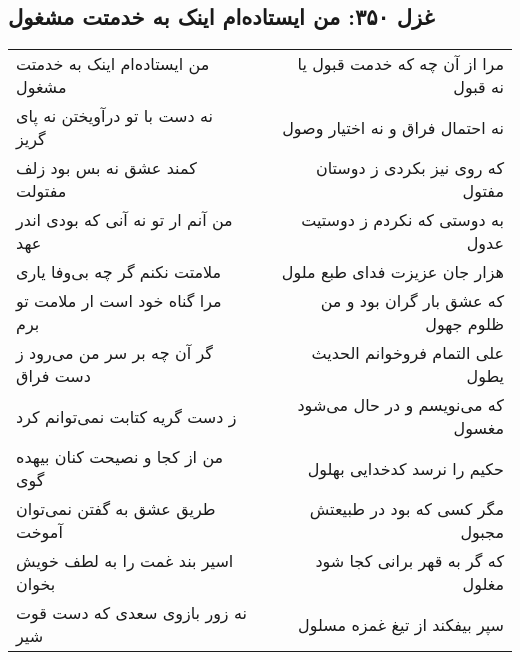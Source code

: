 \begin{center}
\section*{غزل ۳۵۰: من ایستاده‌ام اینک به خدمتت مشغول}
\label{sec:350}
\begin{longtable}{l p{0.5cm} r}
من ایستاده‌ام اینک به خدمتت مشغول
&&
مرا از آن چه که خدمت قبول یا نه قبول
\\
نه دست با تو درآویختن نه پای گریز
&&
نه احتمال فراق و نه اختیار وصول
\\
کمند عشق نه بس بود زلف مفتولت
&&
که روی نیز بکردی ز دوستان مفتول
\\
من آنم ار تو نه آنی که بودی اندر عهد
&&
به دوستی که نکردم ز دوستیت عدول
\\
ملامتت نکنم گر چه بی‌وفا یاری
&&
هزار جان عزیزت فدای طبع ملول
\\
مرا گناه خود است ار ملامت تو برم
&&
که عشق بار گران بود و من ظلوم جهول
\\
گر آن چه بر سر من می‌رود ز دست فراق
&&
علی التمام فروخوانم الحدیث یطول
\\
ز دست گریه کتابت نمی‌توانم کرد
&&
که می‌نویسم و در حال می‌شود مغسول
\\
من از کجا و نصیحت کنان بیهده گوی
&&
حکیم را نرسد کدخدایی بهلول
\\
طریق عشق به گفتن نمی‌توان آموخت
&&
مگر کسی که بود در طبیعتش مجبول
\\
اسیر بند غمت را به لطف خویش بخوان
&&
که گر به قهر برانی کجا شود مغلول
\\
نه زور بازوی سعدی که دست قوت شیر
&&
سپر بیفکند از تیغ غمزه مسلول
\\
\end{longtable}
\end{center}
